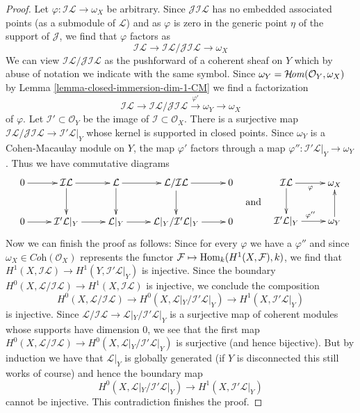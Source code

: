 \begin{proof}
\medskip\noindent
Let $\varphi : \mathcal{I}\mathcal{L} \to \omega_X$ be arbitrary.
Since $\mathcal{J}\mathcal{I}\mathcal{L}$
has no embedded associated points
(as a submodule of $\mathcal{L}$) and as $\varphi$ is zero
in the generic point $\eta$ of the support of $\mathcal{J}$, we find that
$\varphi$ factors as
$$
\mathcal{I}\mathcal{L} \to
\mathcal{I}\mathcal{L}/\mathcal{J}\mathcal{I}\mathcal{L} \to \omega_X
$$
We can view $\mathcal{I}\mathcal{L}/\mathcal{J}\mathcal{I}\mathcal{L}$
as the pushforward of a coherent sheaf on $Y$ which by abuse of
notation we indicate with the same symbol.
Since $\omega_Y = \mathop{\mathcal{H}\!\mathit{om}}\nolimits(\mathcal{O}_Y, \omega_X)$
by Lemma \ref{lemma-closed-immersion-dim-1-CM}
we find a factorization
$$
\mathcal{I}\mathcal{L} \to
\mathcal{I}\mathcal{L}/
\mathcal{J}\mathcal{I}\mathcal{L} 
\xrightarrow{\varphi'} \omega_Y \to \omega_X
$$
of $\varphi$. Let $\mathcal{I}' \subset \mathcal{O}_Y$ be the
image of $\mathcal{I} \subset \mathcal{O}_X$. There is a surjective map
$\mathcal{I}\mathcal{L}/\mathcal{J}\mathcal{I}\mathcal{L} \to
\mathcal{I}'\mathcal{L}|_Y$ whose kernel is supported in closed points.
Since $\omega_Y$ is a Cohen-Macaulay module on $Y$, the map $\varphi'$
factors through a map
$\varphi'' : \mathcal{I}'\mathcal{L}|_Y \to \omega_Y$.
Thus we have commutative diagrams
$$
\vcenter{
\xymatrix{
0 \ar[r] &
\mathcal{I}\mathcal{L} \ar[r] \ar[d] &
\mathcal{L} \ar[r] \ar[d] &
\mathcal{L}/\mathcal{I}\mathcal{L} \ar[r] \ar[d] &
0 \\
0 \ar[r] &
\mathcal{I}'\mathcal{L}|_Y \ar[r] &
\mathcal{L}|_Y \ar[r] &
\mathcal{L}|_Y/\mathcal{I}'\mathcal{L}|_Y \ar[r] &
0
}
}
\quad\text{and}\quad
\vcenter{
\xymatrix{
\mathcal{I}\mathcal{L} \ar[r]_\varphi \ar[d] & \omega_X \\
\mathcal{I}'\mathcal{L}|_Y \ar[r]^{\varphi''} & \omega_Y \ar[u]
}
}
$$
Now we can finish the proof as follows:
Since for every $\varphi$ we have a $\varphi''$ and since
$\omega_X \in \textit{Coh}(\mathcal{O}_X)$
represents the functor $\mathcal{F} \mapsto \mathop{\mathrm{Hom}}\nolimits_k(H^1(X, \mathcal{F}), k)$,
we find that
$H^1(X, \mathcal{I}\mathcal{L}) \to H^1(Y, \mathcal{I}'\mathcal{L}|_Y)$
is injective. Since the boundary
$H^0(X, \mathcal{L}/\mathcal{I}\mathcal{L}) \to H^1(X, \mathcal{I}\mathcal{L})$
is injective, we conclude the composition
$$
H^0(X, \mathcal{L}/\mathcal{I}\mathcal{L}) \to
H^0(X, \mathcal{L}|_Y/\mathcal{I}'\mathcal{L}|_Y) \to
H^1(X, \mathcal{I}'\mathcal{L}|_Y)
$$
is injective. Since
$\mathcal{L}/\mathcal{I}\mathcal{L} \to
\mathcal{L}|_Y/\mathcal{I}'\mathcal{L}|_Y$
is a surjective map of coherent modules whose supports have
dimension $0$, we see that the first map
$H^0(X, \mathcal{L}/\mathcal{I}\mathcal{L}) \to
H^0(X, \mathcal{L}|_Y/\mathcal{I}'\mathcal{L}|_Y)$
is surjective (and hence bijective).
But by induction we have that $\mathcal{L}|_Y$ is globally
generated (if $Y$ is disconnected this still works of course)
and hence the boundary map
$$
H^0(X, \mathcal{L}|_Y/\mathcal{I}'\mathcal{L}|_Y) \to
H^1(X, \mathcal{I}'\mathcal{L}|_Y)
$$
cannot be injective.
This contradiction finishes the proof.
\end{proof}






